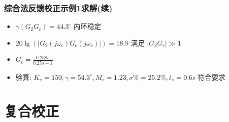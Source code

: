 \documentclass[table]{article}
\begin{document}
\begin{frame}
\frametitle{综合法反馈校正示例1求解(续)}
\label{sec-6-3-8}

\begin{itemize}
\item $\gamma(G_2G_c)=44.3^{\circ}$ 内环稳定
\item $20\lg(|G_2(j\omega_c)G_c(j\omega_c)|)=18.9$ 满足 $|G_2G_c|\gg 1$
\item $G_c=\frac{0.238s}{0.25s+1}$
\item 验算: $K_v=150,\gamma=54.3^{\circ},M_r=1.23,\sigma\%=25.2\%,t_s=0.6s$  符合要求
\end{itemize}
   
\end{frame}
\section{复合校正}
\label{sec-7}
\end{document}
